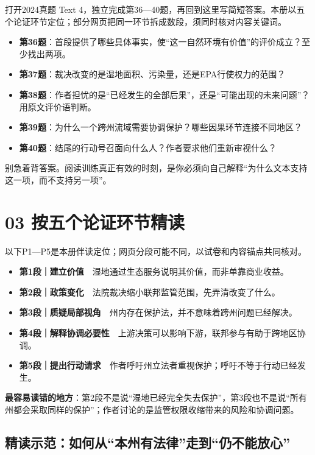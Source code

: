 \documentclass[a4paper,11pt,openany]{report}
\newcommand{\emphasislabel}[1]{\textcolor{leaf}{\CJKsf\bfseries #1}}
\providecommand{\tightlist}{\setlength{\itemsep}{1pt}\setlength{\parskip}{0pt}}
\begin{document}
打开2024真题 Text 4，独立完成第36---40题，再回到这里写简短答案。本册以五个论证环节定位；部分网页把同一环节拆成数段，须同时核对内容关键词。

\begin{itemize}
\tightlist
\item
  \textbf{第36题}：首段提供了哪些具体事实，使``这一自然环境有价值''的评价成立？至少找出两项。
\item
  \textbf{第37题}：裁决改变的是湿地面积、污染量，还是EPA行使权力的范围？
\item
  \textbf{第38题}：作者担忧的是``已经发生的全部后果''，还是``可能出现的未来问题''？用原文评价语判断。
\item
  \textbf{第39题}：为什么一个跨州流域需要协调保护？哪些因果环节连接不同地区？
\item
  \textbf{第40题}：结尾的行动号召面向什么人？作者要求他们重新审视什么？
\end{itemize}

别急着背答案。阅读训练真正有效的时刻，是你必须向自己解释``为什么文本支持这一项，而不支持另一项''。

\section{03 按五个论证环节精读}\label{ux6309ux4e94ux4e2aux8bbaux8bc1ux73afux8282ux7cbeux8bfb}

以下P1---P5是本册伴读定位；网页分段可能不同，以试卷和内容锚点共同核对。

\begin{itemize}
\tightlist
\item
  \textbf{第1段｜建立价值}　湿地通过生态服务说明其价值，而非单靠商业收益。
\item
  \textbf{第2段｜政策变化}　法院裁决缩小联邦监管范围，先弄清改变了什么。
\item
  \textbf{第3段｜质疑局部视角}　州内存在保护法，并不意味着跨州问题已经解决。
\item
  \textbf{第4段｜解释协调必要性}　上游决策可以影响下游，联邦参与有助于跨地区协调。
\item
  \textbf{第5段｜提出行动请求}　作者呼吁州立法者重视保护；呼吁不等于行动已经发生。
\end{itemize}

\emphasislabel{最容易读错的地方}：第2段不是说``湿地已经完全失去保护''，第3段也不是说``所有州都会采取同样的保护''；作者讨论的是监管权限收缩带来的风险和协调问题。

\subsection{精读示范：如何从``本州有法律''走到``仍不能放心''}\label{ux7cbeux8bfbux793aux8303ux5982ux4f55ux4eceux672cux5ddeux6709ux6cd5ux5f8bux8d70ux5230ux4ecdux4e0dux80fdux653eux5fc3}
\end{document}
